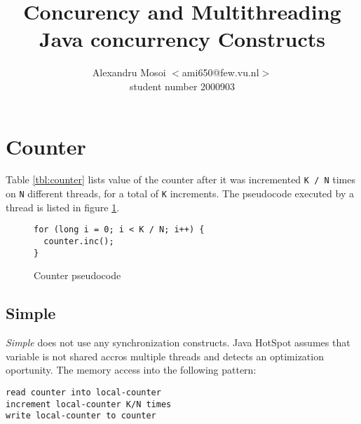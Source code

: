 \documentclass[12pt]{article}
\title{Concurency and Multithreading\\
       Java concurrency Constructs}
\author{Alexandru Mosoi $<$ami650@few.vu.nl$>$\\
        student number 2000903}
\begin{document}
\maketitle


\section{Counter}

\begin{table}[h!]
  \centering
  \small

  \caption{Counter value for variable N and K = 2.000.000.000 on a 4 logical
  cores processor}
  \label{tbl:counter}
\end{table}


Table \ref{tbl:counter} lists value of the counter after it was incremented
\texttt{K / N} times on \texttt{N} different threads, for a total of
\texttt{K} increments. The pseudocode executed by a thread is listed in
figure \ref{fig:counter-pseudocode}.

\begin{figure}[h!]
  \begin{Verbatim}[frame=single]
for (long i = 0; i < K / N; i++) {
  counter.inc();
}
  \end{Verbatim}
  \caption{Counter pseudocode}
  \label{fig:counter-pseudocode}
\end{figure}

\subsection{Simple}
\label{ssec:simple}

\emph{Simple} does not use any synchronization constructs. Java
HotSpot assumes that variable is not shared accros multiple threads and
detects an optimization oportunity. The memory access into the following
pattern:

\begin{verbatim}
read counter into local-counter
increment local-counter K/N times
write local-counter to counter
\end{verbatim}
\end{document}
